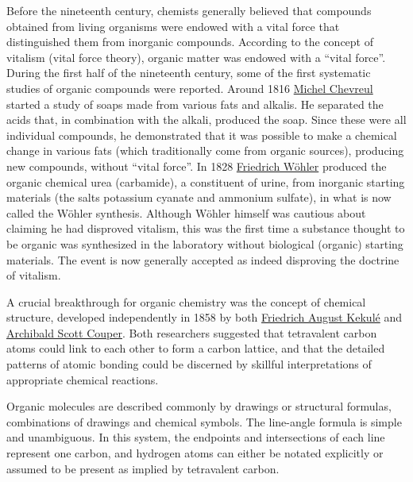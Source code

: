 Before the nineteenth century, chemists generally believed that compounds obtained from living organisms were endowed with a vital force that distinguished them from inorganic compounds. According to the concept of vitalism (vital force theory), organic matter was endowed with a ``vital force''. During the first half of the nineteenth century, some of the first systematic studies of organic compounds were reported. Around 1816 \href{https://en.wikipedia.org/wiki/Michel_Eugène_Chevreul}{Michel Chevreul} started a study of soaps made from various fats and alkalis. He separated the acids that, in combination with the alkali, produced the soap. Since these were all individual compounds, he demonstrated that it was possible to make a chemical change in various fats (which traditionally come from organic sources), producing new compounds, without ``vital force''. In 1828 \href{https://en.wikipedia.org/wiki/Friedrich_Wöhler}{Friedrich Wöhler} produced the organic chemical urea (carbamide), a constituent of urine, from inorganic starting materials (the salts potassium cyanate and ammonium sulfate), in what is now called the Wöhler synthesis. Although Wöhler himself was cautious about claiming he had disproved vitalism, this was the first time a substance thought to be organic was synthesized in the laboratory without biological (organic) starting materials. The event is now generally accepted as indeed disproving the doctrine of vitalism.

A crucial breakthrough for organic chemistry was the concept of chemical structure, developed independently in 1858 by both \href{https://en.wikipedia.org/wiki/August_Kekulé}{Friedrich August Kekulé} and \href{https://en.wikipedia.org/wiki/Archibald_Scott_Couper}{Archibald Scott Couper}. Both researchers suggested that tetravalent carbon atoms could link to each other to form a carbon lattice, and that the detailed patterns of atomic bonding could be discerned by skillful interpretations of appropriate chemical reactions.

Organic molecules are described commonly by drawings or structural formulas, combinations of drawings and chemical symbols. The line-angle formula is simple and unambiguous. In this system, the endpoints and intersections of each line represent one carbon, and hydrogen atoms can either be notated explicitly or assumed to be present as implied by tetravalent carbon.



